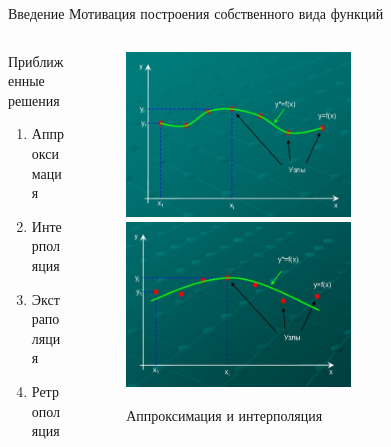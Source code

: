\documentclass{beamer}
\begin{document}
\begin{frame}{Введение} {Мотивация построения собственного вида функций}
\begin{columns}
\begin{column}{0.5\textwidth}
				Приближенные решения
					\begin{enumerate}
						\item Аппроксимация
						\item Интерполяция
						\item Экстраполяция
						\item Ретрополяция
					\end{enumerate}
			\end{column}
			\begin{column}{0.5\textwidth}
				\begin{figure} 
					\includegraphics[width=0.65\textwidth]{images/interpolation.png}
					\includegraphics[width=0.65\textwidth]{images/approximation.png}
					\caption {Аппроксимация и интерполяция}
				\end{figure}
			\end{column}
		\end{columns}
			
\end{frame}
\end{document}
